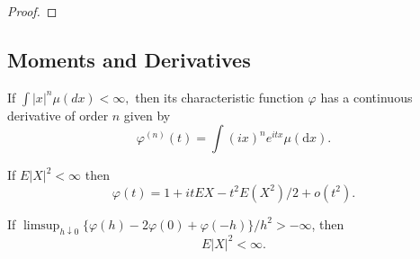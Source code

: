 \begin{proof}
    
\end{proof}

\subsection{Moments and Derivatives}

\begin{theorem}{}{}
    If $\int|x|^{n}\mu(d x)<\infty,$ then its characteristic function $\varphi$ has a continuous derivative of order $n$ given by
    \begin{equation}
        \varphi^{(n)}(t)=\int(i x)^{n}e^{itx}\mu(\mathrm{d}x).
    \end{equation}
\end{theorem}

\begin{theorem}{}{}
    If $E|X|^{2}<\infty$ then
    \begin{equation}
        \varphi(t)=1+itEX-t^{2}E\left(X^{2}\right)/2+o\left(t^{2}\right).
    \end{equation}
\end{theorem}

\begin{theorem}{}{}
    If $\limsup_{h\downarrow 0}\{\varphi(h)-2\varphi(0)+\varphi(-h)\}/h^{2}>-\infty$, then
    \begin{equation}
        E|X|^{2}<\infty.
    \end{equation}
\end{theorem}